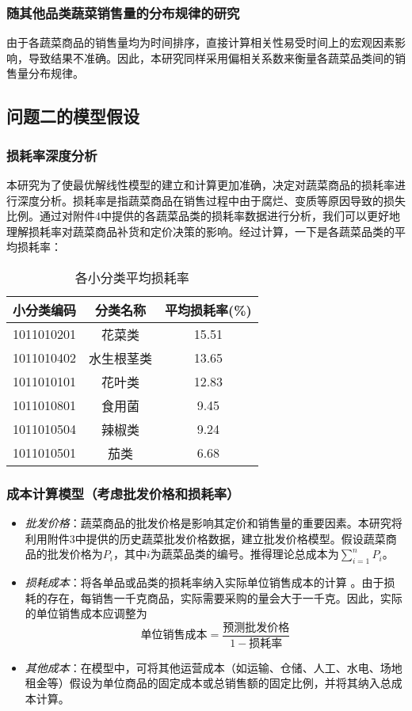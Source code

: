 \documentclass{article}
\begin{document}
\subsubsection{随其他品类蔬菜销售量的分布规律的研究}
由于各蔬菜商品的销售量均为时间排序，直接计算相关性易受时间上的宏观因素影响，导致结果不准确。因此，本研究同样采用偏相关系数来衡量各蔬菜品类间的销售量分布规律。

\subsection{问题二的模型假设}

\subsubsection{损耗率深度分析}
本研究为了使最优解线性模型的建立和计算更加准确，决定对蔬菜商品的损耗率进行深度分析。损耗率是指蔬菜商品在销售过程中由于腐烂、变质等原因导致的损失比例。通过对附件4中提供的各蔬菜品类的损耗率数据进行分析，我们可以更好地理解损耗率对蔬菜商品补货和定价决策的影响。经过计算，一下是各蔬菜品类的平均损耗率：
\begin{table}[H]
\centering
\caption{各小分类平均损耗率}
\begin{tabular}{|c|c|c|}
\hline
小分类编码 & 分类名称 & 平均损耗率(\%) \\
\hline
1011010201 & 花菜类 & 15.51 \\
1011010402 & 水生根茎类 & 13.65 \\
1011010101 & 花叶类 & 12.83 \\
1011010801 & 食用菌 & 9.45 \\
1011010504 & 辣椒类 & 9.24 \\
1011010501 & 茄类 & 6.68\\
\hline
\end{tabular}
\end{table}

\subsubsection{成本计算模型（考虑批发价格和损耗率）}
\begin{itemize}
    \item \textit{批发价格}：蔬菜商品的批发价格是影响其定价和销售量的重要因素。本研究将利用附件3中提供的历史蔬菜批发价格数据，建立批发价格模型。假设蔬菜商品的批发价格为$P_i$，其中$i$为蔬菜品类的编号。推得理论总成本为$\sum_{i=1}^{n} P_i $。
    \item \textit{损耗成本}：将各单品或品类的损耗率纳入实际单位销售成本的计算 。由于损耗的存在，每销售一千克商品，实际需要采购的量会大于一千克。因此，实际的单位销售成本应调整为 
    \[
    \text{单位销售成本} = \frac{\text{预测批发价格}}{1 - \text{损耗率}}
    \]
    \item \textit{其他成本}：在模型中，可将其他运营成本（如运输、仓储、人工、水电、场地租金等）假设为单位商品的固定成本或总销售额的固定比例，并将其纳入总成本计算。
\end{itemize}
\end{document}
